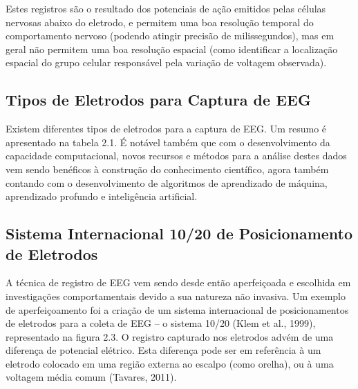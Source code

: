   Estes registros são o resultado dos potenciais de ação emitidos pelas células nervosas abaixo do eletrodo, 
  e permitem uma boa resolução temporal do comportamento nervoso (podendo atingir precisão de milissegundos), 
  mas em geral não permitem uma boa resolução espacial (como identificar a localização espacial do grupo celular responsável pela variação de voltagem observada). 



  

    \subsection{Tipos de Eletrodos para Captura de EEG}

    Existem diferentes tipos de eletrodos para a captura de EEG. Um resumo é apresentado na tabela 2.1. É notável também que com o desenvolvimento da capacidade computacional, novos recursos e métodos para a análise destes dados vem sendo benéficos à construção do conhecimento científico, agora também contando com o desenvolvimento de algoritmos de aprendizado de máquina, aprendizado profundo e inteligência artificial. 
  
\subsection{Sistema Internacional 10/20 de Posicionamento de Eletrodos}

A técnica de registro de EEG vem sendo desde então aperfeiçoada e escolhida em investigações 
comportamentais devido a sua natureza não invasiva.
 Um exemplo de aperfeiçoamento foi a criação de um sistema internacional de posicionamentos 
 de eletrodos para a coleta de EEG – o sistema 10/20 (Klem et al., 1999), 
 representado na figura 2.3. 
 O registro capturado nos eletrodos advém de uma 
 diferença de potencial elétrico. Esta diferença pode ser em 
 referência à um eletrodo colocado em uma região externa ao escalpo (como orelha), 
 ou à uma voltagem média comum (Tavares, 2011).






